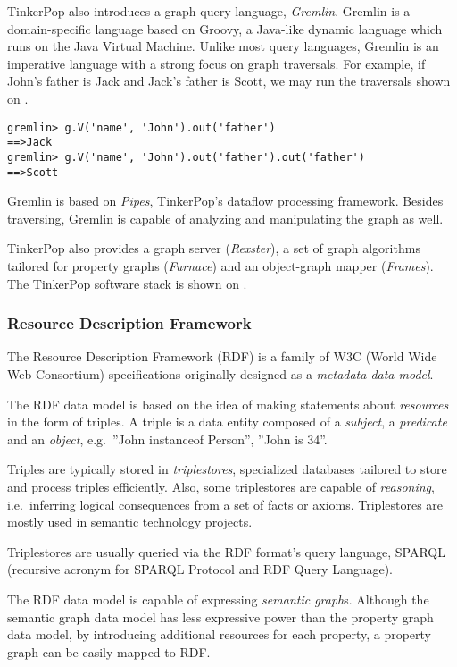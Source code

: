 TinkerPop also introduces a graph query language, \textit{Gremlin}. Gremlin is a domain-specific language based on Groovy, a Java-like dynamic language which runs on the Java Virtual Machine. Unlike most query languages, Gremlin is an imperative language with a strong focus on graph traversals. For example, if John's father is Jack and Jack's father is Scott, we may run the traversals shown on .

\begin{lstlisting}[caption=Simple Gremlin queries, label=lst:gremlin-queries]
gremlin> g.V('name', 'John').out('father')
==>Jack
gremlin> g.V('name', 'John').out('father').out('father')
==>Scott
\end{lstlisting}

Gremlin is based on \textit{Pipes}, TinkerPop's dataflow processing framework. Besides traversing, Gremlin is capable of analyzing and manipulating the graph as well.

TinkerPop also provides a graph server (\textit{Rexster}), a set of graph algorithms tailored for property graphs (\textit{Furnace}) and an object-graph mapper (\textit{Frames}). The TinkerPop software stack is shown on .

\subsubsection{Resource Description Framework}

The Resource Description Framework (RDF) is a family of W3C (World Wide Web Consortium) specifications originally designed as a \emph{metadata data model}. 

The RDF data model is based on the idea of making statements about \emph{resources} in the form of triples. A triple is a data entity composed of a \emph{subject}, a \emph{predicate} and an \emph{object}, e.g.\ ''John instanceof Person'', ''John is 34''.  

Triples are typically stored in \emph{triplestores}, specialized databases tailored to store and process triples efficiently. Also, some triplestores are capable of \emph{reasoning}, i.e.\ inferring logical consequences from a set of facts or axioms. Triplestores are mostly used in semantic technology projects.

Triplestores are usually queried via the RDF format's query language, SPARQL (recursive acronym for SPARQL Protocol and RDF Query Language). 

The RDF data model is capable of expressing \emph{semantic graph}s. Although the semantic graph data model has less expressive power than the property graph data model, by introducing additional resources for each property, a property graph can be easily mapped to RDF.

